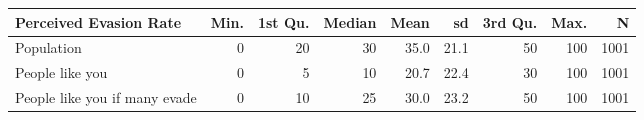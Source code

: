 \begin{table}[ht]
\centering
\begin{tabular}{lrrrrrrrr}
  \hline
Perceived Evasion Rate & Min. & 1st Qu. & Median & Mean & sd & 3rd Qu. & Max. & N \\ 
  \hline
Population &  0 & 20 & 30 & 35.0 & 21.1 & 50 & 100 & 1001 \\ 
  People like you &  0 &  5 & 10 & 20.7 & 22.4 & 30 & 100 & 1001 \\ 
  People like you if many evade &  0 & 10 & 25 & 30.0 & 23.2 & 50 & 100 & 1001 \\ 
   \hline
\end{tabular}
\end{table}
